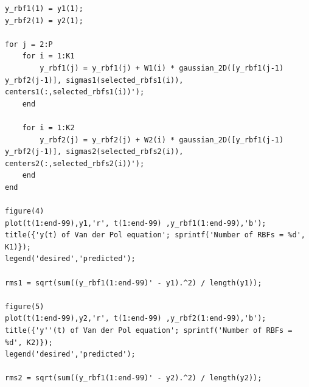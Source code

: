 \begin{lstlisting}
y_rbf1(1) = y1(1);
y_rbf2(1) = y2(1);

for j = 2:P
    for i = 1:K1
        y_rbf1(j) = y_rbf1(j) + W1(i) * gaussian_2D([y_rbf1(j-1) y_rbf2(j-1)], sigmas1(selected_rbfs1(i)), centers1(:,selected_rbfs1(i))');
    end
    
    for i = 1:K2
        y_rbf2(j) = y_rbf2(j) + W2(i) * gaussian_2D([y_rbf1(j-1) y_rbf2(j-1)], sigmas2(selected_rbfs2(i)), centers2(:,selected_rbfs2(i))');        
    end
end

figure(4)
plot(t(1:end-99),y1,'r', t(1:end-99) ,y_rbf1(1:end-99),'b');
title({'y(t) of Van der Pol equation'; sprintf('Number of RBFs = %d', K1)});
legend('desired','predicted');

rms1 = sqrt(sum((y_rbf1(1:end-99)' - y1).^2) / length(y1));

figure(5)
plot(t(1:end-99),y2,'r', t(1:end-99) ,y_rbf2(1:end-99),'b');
title({'y''(t) of Van der Pol equation'; sprintf('Number of RBFs = %d', K2)});
legend('desired','predicted');

rms2 = sqrt(sum((y_rbf1(1:end-99)' - y2).^2) / length(y2));
\end{lstlisting}


